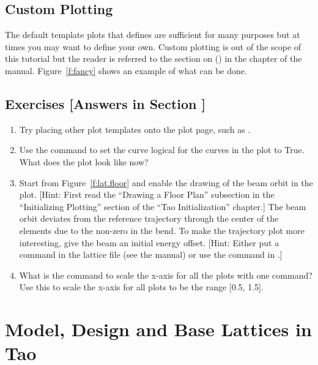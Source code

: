 \documentclass{hitec}     %
\newcommand{\Section}[1]{\section{#1}\vspace*{-1ex}}
\begin{document}
\subsection{Custom Plotting}
\label{s:plot.custom}

The default template plots that \tao defines are sufficient for many purposes but at times you may
want to define your own. Custom plotting is out of the scope of this tutorial but the reader is
referred to the section on  () in the  chapter of the \tao manual. Figure~\ref{f:fancy} shows an example of what can be done.

\subsection{Exercises [Answers in Section ]}
\label{s:plotting.ex}

\begin{enumerate}[label=\thesection.\arabic{enumi}]
\item Try placing other plot templates onto the plot page, such as .
%
\item Use the  command to set the  curve logical for the curves
in the  plot to True. What does the  plot look like now?
%
\item Start from Figure~\ref{f:lat.floor} and enable the drawing of the beam orbit in the  
plot. [Hint: First read the ``Drawing a Floor Plan'' subsection in the ``Initializing Plotting''
section of the ``Tao Initialization'' chapter.] The beam orbit deviates from the reference trajectory
through the center of the elements due to the non-zero  in the bend. To make the trajectory
plot more interesting, give the beam an initial energy offset. [Hint: Either put a 
command in the lattice file (see the \bmad manual) or use the  command in \tao.]
%
\item
What is the command to scale the x-axis for all the plots with one command? Use this to scale the
x-axis for all plots to be the range [0.5, 1.5].

\end{enumerate}

\newpage

\Section{Model, Design and Base Lattices in Tao}
\label{s:three.lat}
\end{document}
